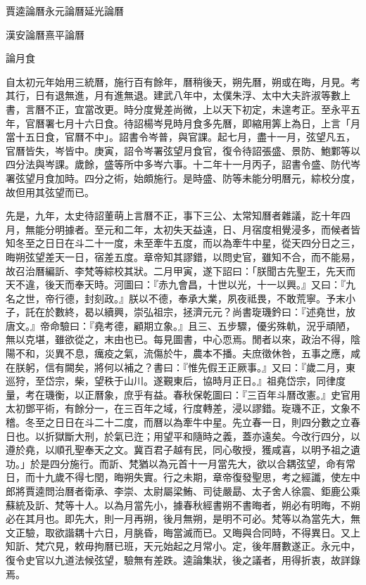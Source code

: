 
\begin{pinyinscope}
賈逵論曆永元論曆延光論曆

漢安論曆熹平論曆

論月食

自太初元年始用三統曆，施行百有餘年，曆稍後天，朔先曆，朔或在晦，月見。考其行，日有退無進，月有進無退。建武八年中，太僕朱浮、太中大夫許淑等數上書，言曆不正，宜當改更。時分度覺差尚微，上以天下初定，未遑考正。至永平五年，官曆署七月十六日食。待詔楊岑見時月食多先曆，即縮用筭上為日，上言「月當十五日食，官曆不中」。詔書令岑普，與官課。起七月，盡十一月，弦望凡五，官曆皆失，岑皆中。庚寅，詔令岑署弦望月食官，復令待詔張盛、景防、鮑鄴等以四分法與岑課。歲餘，盛等所中多岑六事。十二年十一月丙子，詔書令盛、防代岑署弦望月食加時。四分之術，始頗施行。是時盛、防等未能分明曆元，綜校分度，故但用其弦望而已。

先是，九年，太史待詔董萌上言曆不正，事下三公、太常知曆者雜議，訖十年四月，無能分明據者。至元和二年，太初失天益遠，日、月宿度相覺浸多，而候者皆知冬至之日日在斗二十一度，未至牽牛五度，而以為牽牛中星，從天四分日之三，晦朔弦望差天一日，宿差五度。章帝知其謬錯，以問史官，雖知不合，而不能易，故召治曆編訢、李梵等綜校其狀。二月甲寅，遂下詔曰：「朕聞古先聖王，先天而天不違，後天而奉天時。河圖曰：『赤九會昌，十世以光，十一以興。』又曰：『九名之世，帝行德，封刻政。』朕以不德，奉承大業，夙夜祗畏，不敢荒寧。予末小子，託在於數終，曷以續興，崇弘祖宗，拯濟元元？尚書琁璣鈐曰：『述堯世，放唐文。』帝命驗曰：『堯考德，顧期立象。』且三、五步驟，優劣殊軌，況乎頑陋，無以克堪，雖欲從之，末由也已。每見圖書，中心恧焉。閒者以來，政治不得，陰陽不和，災異不息，癘疫之氣，流傷於牛，農本不播。夫庶徵休咎，五事之應，咸在朕躬，信有闕矣，將何以補之？書曰：『惟先假王正厥事。』又曰：『歲二月，東巡狩，至岱宗，柴，望秩于山川。遂覲東后，協時月正日。』祖堯岱宗，同律度量，考在璣衡，以正曆象，庶乎有益。春秋保乾圖曰：『三百年斗曆改憲。』史官用太初鄧平術，有餘分一，在三百年之域，行度轉差，浸以謬錯。琁璣不正，文象不稽。冬至之日日在斗二十二度，而曆以為牽牛中星。先立春一日，則四分數之立春日也。以折獄斷大刑，於氣已迕；用望平和隨時之義，蓋亦遠矣。今改行四分，以遵於堯，以順孔聖奉天之文。冀百君子越有民，同心敬授，獲咸喜，以明予祖之遺功。」於是四分施行。而訢、梵猶以為元首十一月當先大，欲以合耦弦望，命有常日，而十九歲不得七閏，晦朔失實。行之未期，章帝復發聖思，考之經讖，使左中郎將賈逵問治曆者衛承、李崇、太尉屬梁鮪、司徒嚴勗、太子舍人徐震、鉅鹿公乘蘇統及訢、梵等十人。以為月當先小，據春秋經書朔不書晦者，朔必有明晦，不朔必在其月也。即先大，則一月再朔，後月無朔，是明不可必。梵等以為當先大，無文正驗，取欲諧耦十六日，月朓昏，晦當滅而已。又晦與合同時，不得異日。又上知訢、梵穴見，敕毋拘曆已班，天元始起之月常小。定，後年曆數遂正。永元中，復令史官以九道法候弦望，驗無有差跌。逵論集狀，後之議者，用得折衷，故詳錄焉。


\end{pinyinscope}
